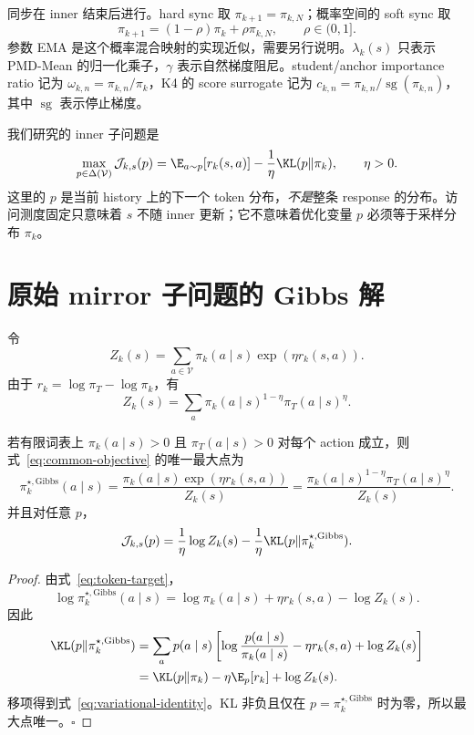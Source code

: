 同步在 inner 结束后进行。hard sync 取 $\pi_{k+1}=\pi_{k,N}$；概率空间的 soft sync 取
\begin{equation}
\pi_{k+1}=(1-\rho)\pi_k+\rho\pi_{k,N},\qquad\rho\in(0,1].
\end{equation}
参数 EMA 是这个概率混合映射的实现近似，需要另行说明。$\lambda_k(s)$ 只表示 PMD-Mean 的归一化乘子，$\gamma$ 表示自然梯度阻尼。student/anchor importance ratio 记为 $\omega_{k,n}=\pi_{k,n}/\pi_k$，K4 的 score surrogate 记为 $c_{k,n}=\pi_{k,n}/\operatorname{sg}(\pi_{k,n})$，其中 $\operatorname{sg}$ 表示停止梯度。

我们研究的 inner 子问题是
\begin{equation}\label{eq:common-objective}
 \max_{p\in\Delta(\mathcal V)}
 \mathcal J_{k,s}(p)
 =\E_{a\sim p}[r_k(s,a)]-
 \frac{1}{\eta}\KL(p\Vert\pi_k),
 \qquad \eta>0.
\end{equation}
这里的 $p$ 是当前 history 上的下一个 token 分布，\emph{不是}整条 response 的分布。访问测度固定只意味着 $s$ 不随 inner 更新；它不意味着优化变量 $p$ 必须等于采样分布 $\pi_k$。

\section{原始 mirror 子问题的 Gibbs 解}

令
\[
 Z_k(s)=\sum_{a\in\mathcal V}\pi_k(a\mid s)\exp(\eta r_k(s,a)).
\]
由于 $r_k=\log\pi_T-\log\pi_k$，有
\begin{equation}\label{eq:token-partition}
 Z_k(s)=\sum_a\pi_k(a\mid s)^{1-\eta}\pi_T(a\mid s)^\eta.
\end{equation}

\begin{theorem}
\label{thm:token-target}
若有限词表上 $\pi_k(a\mid s)>0$ 且 $\pi_T(a\mid s)>0$ 对每个 action 成立，则式~\eqref{eq:common-objective} 的唯一最大点为
\begin{equation}\label{eq:token-target}
 \pi_k^{\star,\mathrm{Gibbs}}(a\mid s)=
 \frac{\pi_k(a\mid s)\exp(\eta r_k(s,a))}{Z_k(s)}
 =\frac{\pi_k(a\mid s)^{1-\eta}\pi_T(a\mid s)^\eta}{Z_k(s)}.
\end{equation}
并且对任意 $p$，
\begin{equation}\label{eq:variational-identity}
 \mathcal J_{k,s}(p)
 =\frac{1}{\eta}\log Z_k(s)
 -\frac{1}{\eta}\KL(p\Vert \pi_k^{\star,\mathrm{Gibbs}}).
\end{equation}
\end{theorem}

\begin{proof}
由式~\eqref{eq:token-target}，
\[
 \log \pi_k^{\star,\mathrm{Gibbs}}(a\mid s)=\log\pi_k(a\mid s)+\eta r_k(s,a)-\log Z_k(s).
\]
因此
\begin{align*}
 \KL(p\Vert \pi_k^{\star,\mathrm{Gibbs}})
 &=\sum_a p(a\mid s)\left[
 \log\frac{p(a\mid s)}{\pi_k(a\mid s)}
 -\eta r_k(s,a)+\log Z_k(s)\right]\\
 &=\KL(p\Vert\pi_k)-\eta\E_p[r_k]+\log Z_k(s).
\end{align*}
移项得到式~\eqref{eq:variational-identity}。KL 非负且仅在 $p=\pi_k^{\star,\mathrm{Gibbs}}$ 时为零，所以最大点唯一。\hfill$\square$
\end{proof}

